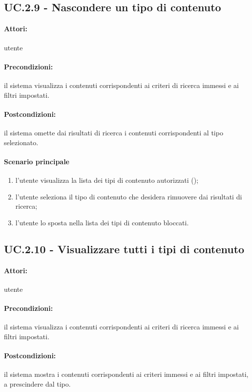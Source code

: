 \documentclass[10pt,a4paper,headinclude,footinclude,hidelinks]{scrreprt} %
\begin{document}
	\subsection[UC.2.9]{UC.2.9 - Nascondere un tipo di contenuto}
	\label{sec:stage:ar:uc:2_9}
	\paragraph{Attori:} utente
	\paragraph{Precondizioni:} il sistema visualizza i contenuti corrispondenti ai criteri di ricerca immessi e ai filtri impostati.
	\paragraph{Postcondizioni:} il sistema omette dai risultati di ricerca i contenuti corrispondenti al tipo selezionato.
	\paragraph{Scenario principale}
	\begin{enumerate}
	\item l'utente visualizza la lista dei tipi di contenuto autorizzati ();
	\item l'utente seleziona il tipo di contenuto che desidera rimuovere dai risultati di ricerca;
	\item l'utente lo sposta nella lista dei tipi di contenuto bloccati.
	\end{enumerate}

	\subsection[UC.2.10]{UC.2.10 - Visualizzare tutti i tipi di contenuto}
	\label{sec:stage:ar:uc:2_10}
	\paragraph{Attori:} utente
	\paragraph{Precondizioni:} il sistema visualizza i contenuti corrispondenti ai criteri di ricerca immessi e ai filtri impostati.
	\paragraph{Postcondizioni:} il sistema mostra i contenuti corrispondenti ai criteri immessi e ai filtri impostati, a prescindere dal tipo.
\end{document}

